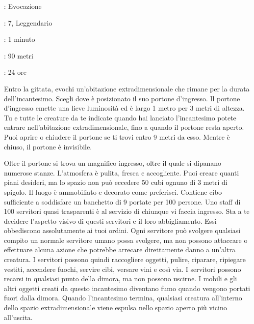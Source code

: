 \begin{multicols}{2}
\noindent\colorbox{OBSSgold!10}{
\begin{minipage}{0.95\linewidth}
\begin{description}[noitemsep, topsep=0pt, parsep=0pt, partopsep=0pt, leftmargin=0cm, labelwidth=1.3cm]
	\item[\textbf{Lista}]: Evocazione
	\item[\textbf{Livello}]: 7, Leggendario
	\item[\textbf{Lancio}]: 1 minuto
	\item[\textbf{Gittata}]: 90 metri
	\item[\textbf{Durata}]: 24 ore
\end{description}
\end{minipage}}\smallskip

Entro la gittata, evochi un'abitazione extradimensionale che rimane per la durata dell'incantesimo. Scegli dove è posizionato il suo portone d'ingresso. Il portone d'ingresso emette una lieve luminosità ed è largo 1 metro per 3 metri di altezza. Tu e tutte le creature da te indicate quando hai lanciato l'incantesimo potete entrare nell'abitazione extradimensionale, fino a quando il portone resta aperto. Puoi aprire o chiudere il portone se ti trovi entro 9 metri da esso. Mentre è chiuso, il portone è invisibile.

Oltre il portone si trova un magnifico ingresso, oltre il quale si dipanano numerose stanze. L'atmosfera è pulita, fresca e accogliente. Puoi creare quanti piani desideri, ma lo spazio non può eccedere 50 cubi ognuno di 3 metri di spigolo. Il luogo è ammobiliato e decorato come preferisci. Contiene cibo sufficiente a soddisfare un banchetto di 9 portate per 100 persone. Uno staff di 100 servitori quasi trasparenti è al servizio di chiunque vi faccia ingresso. Sta a te decidere l'aspetto visivo di questi servitori e il loro abbigliamento. Essi obbediscono assolutamente ai tuoi ordini. Ogni servitore può svolgere qualsiasi compito un normale servitore umano possa svolgere, ma non possono attaccare o effettuare alcuna azione che potrebbe arrecare direttamente danno a un'altra creatura. I servitori possono quindi raccogliere oggetti, pulire, riparare, ripiegare vestiti, accendere fuochi, servire cibi, versare vini e così via. I servitori possono recarsi in qualsiasi punto della dimora, ma non possono uscirne. I mobili e gli altri oggetti creati da questo incantesimo diventano fumo quando vengono portati fuori dalla dimora. Quando l'incantesimo termina, qualsiasi creatura all'interno dello spazio extradimensionale viene espulsa nello spazio aperto più vicino all'uscita.


\end{multicols}
